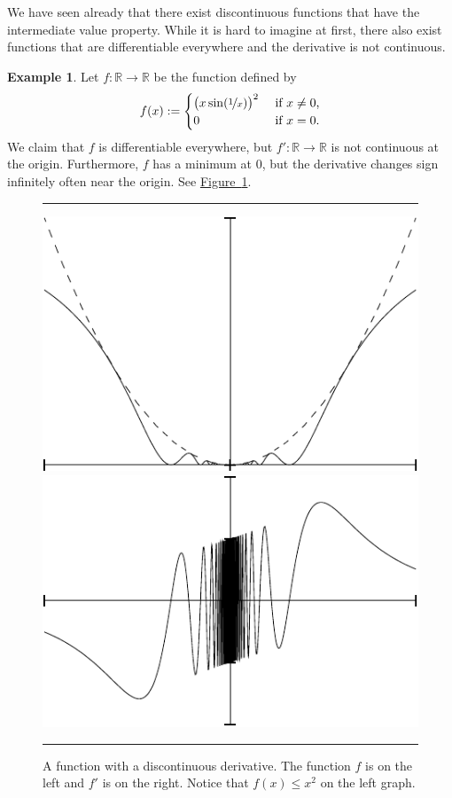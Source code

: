 \documentclass[12pt]{book}
\newenvironment{myfigureht}{%
\begin{figure}[h!t]
\noindent\rule{\textwidth}{0.4pt}\vspace{12pt}\par\centering}%
{\par\noindent\rule{\textwidth}{0.4pt}
\end{figure}}
\newcommand{\R}{{\mathbb{R}}}
\theoremstyle{plain}
\theoremstyle{remark}
\theoremstyle{definition}
\theoremstyle{exercise}
\theoremstyle{example}
\newtheorem{example}[thm]{Example}
\newcommand{\figureref}[1]{\hyperref[#1]{Figure~\ref*{#1}}}
\begin{document}
We have seen already that
there exist discontinuous functions that have the
intermediate value property.  While it is hard to imagine at first, there
also
exist functions that are differentiable everywhere and the derivative is not
continuous.

\begin{example} \label{baddifffunc:example}
Let $f \colon \R \to \R$ be the function defined by
\begin{equation*}
f(x) :=
\begin{cases}
{\bigl( x \sin(\nicefrac{1}{x}) \bigr)}^2 & \text{ if $x \not= 0$,} \\
0 & \text{ if $x = 0$.}
\end{cases}
\end{equation*}
We claim that $f$ is differentiable everywhere, but
$f' \colon \R \to \R$ is not continuous at
the origin.  Furthermore, $f$ has a minimum at 0, but the derivative
changes sign infinitely often near the origin.
See \figureref{fig:nonc1diff}.
\begin{myfigureht}
\includegraphics{figures/nonc1difffig}
\qquad
\includegraphics{figures/nonc1diffderfig}
\caption{A function with a discontinuous derivative. The function $f$ is on the left
and $f'$ is on the right.  Notice that $f(x) \leq x^2$ on the left graph.\label{fig:nonc1diff}}
\end{myfigureht}


\end{example}
\end{document}
